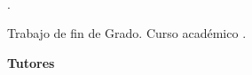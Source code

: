 

\thispagestyle{empty}

\begin{center}
    \textrm{\miNombre} \\ \bigskip                        

    \begingroup
        \textsc{\miTitulo}
    \endgroup
\end{center}        

\newpage

\thispagestyle{empty}

\hfill

\vfill

\noindent\miNombre \textit{\miTitulo}.

Trabajo de fin de Grado. Curso académico \miCurso.

\begin{minipage}[t]{0.15\textwidth}
  \textbf{Tutores}
\end{minipage}
\begin{minipage}[t]{0.55\textwidth}
  \flushleft
  \miTutor
\end{minipage}
\begin{minipage}[t]{0.30\textwidth}
  \flushright
  \miGrado 
  \medskip

  \miFacultad
  \medskip

  \miUniversidad
\end{minipage}
\begin{flushleft}
\end{flushleft}

\endinput
